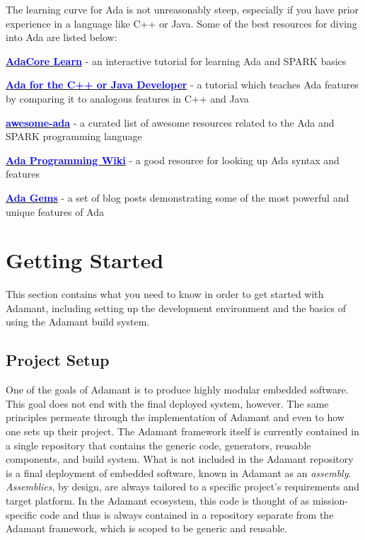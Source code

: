 The learning curve for Ada is not unreasonably steep, especially if you have prior experience in a language like C++ or Java. Some of the best resources for diving into Ada are listed below:

\vspace{5mm} %
\begin{spaceditemize}
  \item \href{https://learn.adacore.com/index.html}{\textbf{\textcolor{blue}{AdaCore Learn}}} - an interactive tutorial for learning Ada and SPARK basics
  \item \href{https://learn.adacore.com/courses/Ada_For_The_CPP_Java_Developer/index.html}{\textbf{\textcolor{blue}{Ada for the C++ or Java Developer}}} - a tutorial which teaches Ada features by comparing it to analogous features in C++ and Java
  \item \href{https://github.com/ohenley/awesome-ada}{\textbf{\textcolor{blue}{awesome-ada}}} - a curated list of awesome resources related to the Ada and SPARK programming language
  \item \href{https://en.wikibooks.org/wiki/Ada_Programming}{\textbf{\textcolor{blue}{Ada Programming Wiki}}} - a good resource for looking up Ada syntax and features
  \item \href{https://www.adacore.com/gems/}{\textbf{\textcolor{blue}{Ada Gems}}} - a set of blog posts demonstrating some of the most powerful and unique features of Ada
\end{spaceditemize}
\vspace{5mm} %

\newpage
\section{Getting Started} \label{Getting Started}

This section contains what you need to know in order to get started with Adamant, including setting up the development environment and the basics of using the Adamant build system.

\subsection{Project Setup} \label{Project Setup}

One of the goals of Adamant is to produce highly modular embedded software. This goal does not end with the final deployed system, however. The same principles permeate through the implementation of Adamant and even to how one sets up their project. The Adamant framework itself is currently contained in a single repository that contains the generic code, generators, reusable components, and build system. What is not included in the Adamant repository is a final deployment of embedded software, known in Adamant as an \textit{assembly}. \textit{Assemblies}, by design, are always tailored to a specific project's requirements and target platform. In the Adamant ecosystem, this code is thought of as mission-specific code and thus is always contained in a repository separate from the Adamant framework, which is scoped to be generic and reusable. \\

